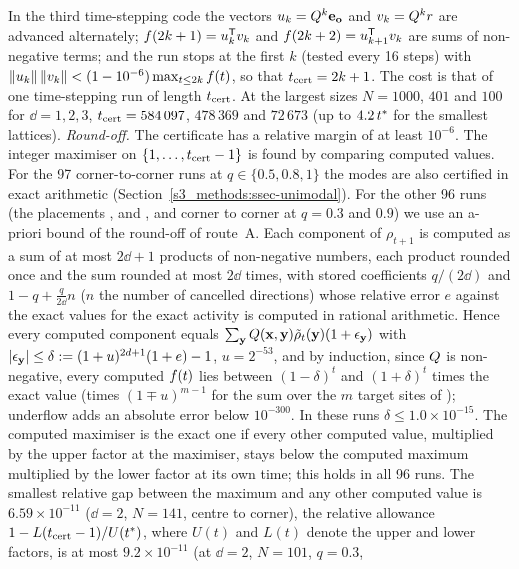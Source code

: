 In the third time-stepping code the vectors $u_k=Q^{k}\mathbf{e}_{\mathbf{o}}$ and $v_k=Q^{k}r$ are advanced alternately;
$f(2k+1)=u_k^{\mathsf{T}}v_k$ and $f(2k+2)=u_{k+1}^{\mathsf{T}}v_k$ are sums of non-negative terms; and the run stops at the
first $k$ (tested every 16 steps) with $\|u_k\|\,\|v_k\|<(1-10^{-6})\max_{t\le2k}f(t)$, so that $t_{\mathrm{cert}}=2k+1$. The
cost is that of one time-stepping run of length $t_{\mathrm{cert}}$. At the largest sizes $N=1000$, $401$ and $100$ for
$\dd=1,2,3$, $t_{\mathrm{cert}}=584\,097$, $478\,369$ and $72\,673$ (up to $4.2\,t^{*}$ for the smallest lattices).
\emph{Round-off.} The certificate has a relative margin of at least $10^{-6}$. The integer maximiser on
$\{1,\dots,t_{\mathrm{cert}}-1\}$ is found by comparing computed values. For the 97 corner-to-corner runs at $q\in\{0.5,0.8,1\}$
the modes are also certified in exact arithmetic (Section~\ref{s3_methods:ssec-unimodal}). For the other 96 runs (the
placements \CtM, \MtC{} and \EXIT, and corner to corner at $q=0.3$ and $0.9$) we use an a-priori bound of the round-off
of route~A. Each component of $\rho_{t+1}$ is computed as a sum of at most $2\dd+1$ products of non-negative numbers,
each product rounded once and the sum rounded at most $2\dd$ times, with stored coefficients $q/(2\dd)$ and
$1-q+\frac{q}{2\dd}n$ ($n$ the number of cancelled directions) whose relative error $e$ against the exact values for the
exact activity is computed in rational arithmetic. Hence every computed component equals
$\sum_{\mathbf{y}}Q(\mathbf{x},\mathbf{y})\tilde\rho_t(\mathbf{y})(1+\epsilon_{\mathbf{y}})$ with $|\epsilon_{\mathbf{y}}|\le\delta:=(1+u)^{2d+1}(1+e)-1$, $u=2^{-53}$,
and by induction, since $Q$ is non-negative, every computed $f(t)$ lies between $(1-\delta)^{t}$ and
$(1+\delta)^{t}$ times the exact value (times $(1\mp u)^{m-1}$ for the sum over the $m$ target sites of \EXIT);
underflow adds an absolute error below $10^{-300}$. In these runs $\delta\le1.0\times10^{-15}$. The computed maximiser is
the exact one if every other computed value, multiplied by the upper factor at the maximiser, stays below the computed
maximum multiplied by the lower factor at its own time; this holds in all 96 runs. The smallest relative gap between
the maximum and any other computed value is $6.59\times10^{-11}$ ($\dd=2$, $N=141$, centre to corner), the relative
allowance $1-L(t_{\mathrm{cert}}-1)/U(t^{*})$, where $U(t)$ and $L(t)$ denote the upper and lower factors, is at most $9.2\times10^{-11}$ (at $\dd=2$, $N=101$, $q=0.3$,
